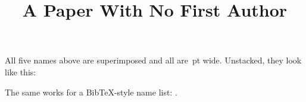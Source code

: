 \documentclass{article}
\title{A Paper With No First Author}
\author{\equalauthorsAuthors}
\date{}
\begin{document}
  \maketitle

  All five names above are superimposed and all are
  \equalauthorsWidth\,pt wide. Unstacked, they look like this:

  \begin{center}
    \equalauthorsAuthorsStacked
  \end{center}

  The same works for a BibTeX-style name list:
  .
\end{document}
